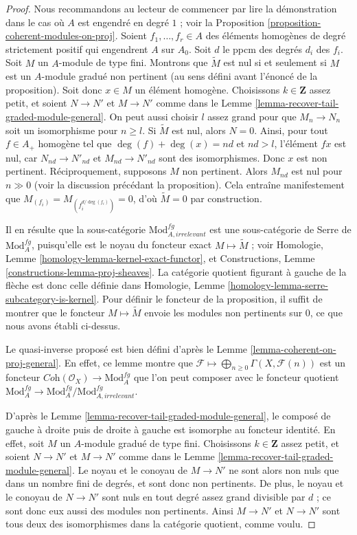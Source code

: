 \begin{proof}
Nous recommandons au lecteur de commencer par lire la démonstration dans le cas
où $A$ est engendré en degré $1$ ; voir la Proposition
\ref{proposition-coherent-modules-on-proj}.
Soient $f_1, \ldots, f_r \in A$ des éléments homogènes de degré strictement
positif qui engendrent $A$ sur $A_0$. Soit $d$ le ppcm des degrés $d_i$
des $f_i$.
Soit $M$ un $A$-module de type fini.
Montrons que $\widetilde{M}$ est nul si et seulement si $M$ est un $A$-module
gradué non pertinent (au sens défini avant l'énoncé de la proposition). Soit
donc $x \in M$ un élément homogène.
Choisissons $k \in \mathbf{Z}$ assez petit, et soient
$N \to N'$ et $M \to N'$ comme dans le Lemme
\ref{lemma-recover-tail-graded-module-general}.
On peut aussi choisir $l$ assez grand pour que $M_n \to N_n$ soit un
isomorphisme pour $n \geq l$.
Si $\widetilde{M}$ est nul, alors $N = 0$.
Ainsi, pour tout $f \in A_+$ homogène tel que
$\deg(f) + \deg(x) = nd$ et $nd > l$, l'élément $fx$ est nul, car
$N_{nd} \to N'_{nd}$ et $M_{nd} \to N'_{nd}$ sont des isomorphismes.
Donc $x$ est non pertinent.
Réciproquement, supposons $M$ non pertinent. Alors $M_{nd}$ est nul pour
$n \gg 0$ (voir la discussion précédant la proposition).
Cela entraîne manifestement que
$M_{(f_i)} = M_{(f_i^{d/\deg(f_i)})} = 0$, d'où
$\widetilde{M} = 0$ par construction.

\medskip\noindent
Il en résulte que la sous-catégorie $\text{Mod}^{fg}_{A, irrelevant}$ est une
sous-catégorie de Serre de $\text{Mod}^{fg}_A$, puisqu'elle est le noyau du
foncteur exact $M \mapsto \widetilde M$ ; voir Homologie, Lemme
\ref{homology-lemma-kernel-exact-functor}, et Constructions, Lemme
\ref{constructions-lemma-proj-sheaves}.
La catégorie quotient figurant à gauche de la flèche est donc celle définie
dans Homologie, Lemme \ref{homology-lemma-serre-subcategory-is-kernel}.
Pour définir le foncteur de la proposition, il suffit de montrer que le
foncteur $M \mapsto \widetilde M$ envoie les modules non pertinents sur $0$,
ce que nous avons établi ci-dessus.

\medskip\noindent
Le quasi-inverse proposé est bien défini d'après le Lemme
\ref{lemma-coherent-on-proj-general}. En effet, ce lemme montre que
$\mathcal{F} \longmapsto \bigoplus_{n \geq 0} \Gamma(X, \mathcal{F}(n))$
est un foncteur $\textit{Coh}(\mathcal{O}_X) \to \text{Mod}^{fg}_A$ que l'on
peut composer avec le foncteur quotient
$\text{Mod}^{fg}_A \to \text{Mod}^{fg}_A/\text{Mod}^{fg}_{A, irrelevant}$.

\medskip\noindent
D'après le Lemme \ref{lemma-recover-tail-graded-module-general}, le composé
de gauche à droite puis de droite à gauche est isomorphe au foncteur identité.
En effet, soit $M$ un $A$-module gradué de type fini. Choisissons
$k \in \mathbf{Z}$ assez petit, et soient $N \to N'$ et $M \to N'$ comme dans
le Lemme \ref{lemma-recover-tail-graded-module-general}.
Le noyau et le conoyau de $M \to N'$ ne sont alors non nuls que dans un nombre
fini de degrés, et sont donc non pertinents. De plus, le noyau et le conoyau de
$N \to N'$ sont nuls en tout degré assez grand divisible par $d$ ; ce sont donc
eux aussi des modules non pertinents. Ainsi $M \to N'$ et $N \to N'$ sont tous
deux des isomorphismes dans la catégorie quotient, comme voulu.


\end{proof}
